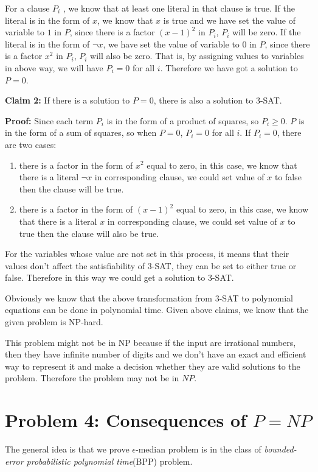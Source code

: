 \documentclass[paper=a4, fontsize=11pt]{scrartcl} %
\numberwithin{equation}{section} %
\numberwithin{figure}{section} %
\numberwithin{table}{section} %
\begin{document}
For a clause $P_i$ , we know that at least one literal in that clause is true. If
the literal is in the form of $x$, we know that $x$ is true and we have set the value of variable to
$1$ in $P$,  since there is a factor
$(x-1)^2$ in $P_i$, $P_i$ will be zero. If the literal is in the form of $\lnot x$, we have set the
value of variable to $0$ in $P$, since there is a factor $x^2$ in $P_i$, $P_i$ will also be zero. That
is, by assigning values to variables in above way, we will have $P_i = 0$ for all $i$. Therefore we
have got a solution to $P= 0$.

\textbf{Claim 2:} If there is a solution to $P=0$, there is also a solution to $3$-SAT.

\textbf{Proof:}
Since each term $P_i$ is in the form of a product of squares, so $P_i \geq 0$. $P$ is in the form of
a sum of squares, so when $P=0$, $P_i = 0$ for all $i$. If $P_i = 0$, there are two cases:
\begin{enumerate}
  \item there is a factor in the form of $x^2$ equal to zero, in this case, we know that there is
    a literal $\lnot x$ in corresponding clause, we could set value of $x$ to false then the clause
    will be true.
  \item there is a factor in the form of $(x-1)^2$ equal to zero, in this case, we know that there is
    a literal $x$ in corresponding clause, we could set value of $x$ to true then the clause
    will also be true.
\end{enumerate}
For the variables whose value are not set in this process, it means that their values don't affect
the satisfiability of $3$-SAT, they can be set to either true or false.
Therefore in this way we could get a solution to $3$-SAT.

Obviously we know that the above transformation from $3$-SAT to polynomial equations can be done in
polynomial time. Given above claims, we know that the given problem is NP-hard.

This problem might not be in NP because if the input are irrational numbers, then they have infinite
number of digits and we don't have an exact and efficient way to represent it and make a decision whether they
are valid solutions to the problem. Therefore the problem may not be in $NP$.

\section*{Problem 4: Consequences of $P = NP$}
The general idea is that we prove $\epsilon$-median problem is in the class of \textit{bounded-error
probabilistic polynomial time}(BPP) problem.
\end{document}
